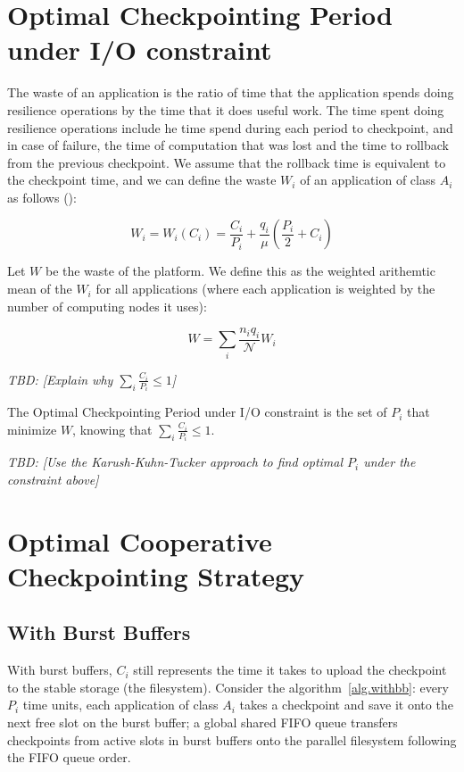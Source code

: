 \documentclass{article}
\newcommand{\nbnodesplat}{{\mathcal N}}
\newcommand{\app}[1]{A_{#1}}
\newcommand{\nbapp}[1]{n_{#1}}
\newcommand{\nbnodes}[1]{q_{#1}}
\newcommand{\period}[1]{P_{#1}}
\newcommand{\ckpt}[1]{C_{#1}}
\newcommand{\wasteapp}[1]{W_{#1}}
\newcommand{\mtbfplat}{\mu}
\newcommand{\wasteplat}{W}
\newcommand{\wastefct}[2]{W_{#1}(#2)}
\newcommand{\todo}[1]{\textit{TBD: [#1]}}
\begin{document}
\section{Optimal Checkpointing Period under I/O constraint}
\label{sec.optimal}

The waste of an application is the ratio of time that the application spends doing
resilience operations by the time that it does useful work. The time
spent doing resilience operations include he time spend during each period to
checkpoint, and in case of failure, the time of computation that was
lost and the time to rollback from the previous checkpoint. We assume
that the rollback time is equivalent to the checkpoint time, and we
can define the waste $\wasteapp{i}$ of an application of class
$\app{i}$ as follows (\cite{springer-monograph}):

$$\wasteapp{i} = \wastefct{i}{\ckpt{i}} = \frac{\ckpt{i}}{\period{i}} +
\frac{\nbnodes{i}}{\mtbfplat}(\frac{\period{i}}{2} + \ckpt{i})$$

Let $\wasteplat$ be the waste of the platform. We define this as the
weighted arithemtic mean of the $\wasteapp{i}$ for all applications
(where each application is weighted by the number of computing nodes
it uses):

$$\wasteplat = \sum_i \frac{\nbapp{i} \nbnodes{i}}{\nbnodesplat} \wasteapp{i}$$

\todo{Explain why $\sum_i \frac{\ckpt{i}}{\period{i}}\leq 1$}

The Optimal Checkpointing Period under I/O constraint is the set of
$\period{i}$ that minimize $\wasteplat$, knowing that $\sum_i
\frac{\ckpt{i}}{\period{i}} \leq 1$.

\todo{Use the Karush-Kuhn-Tucker approach to find optimal
  $\period{i}$ under the constraint above}

\section{Optimal Cooperative Checkpointing Strategy}
\label{sec.strategy}

\subsection{With Burst Buffers}

With burst buffers, $\ckpt{i}$ still represents the time it takes to
upload the checkpoint to the stable storage (the filesystem).
Consider the algorithm~\ref{alg.withbb}: every $\period{i}$ time
units, each application of class $\app{i}$ takes a checkpoint and save
it onto the next free slot on the burst buffer; a global shared FIFO
queue transfers checkpoints from active slots in burst buffers onto
the parallel filesystem following the FIFO queue order.
\end{document}
